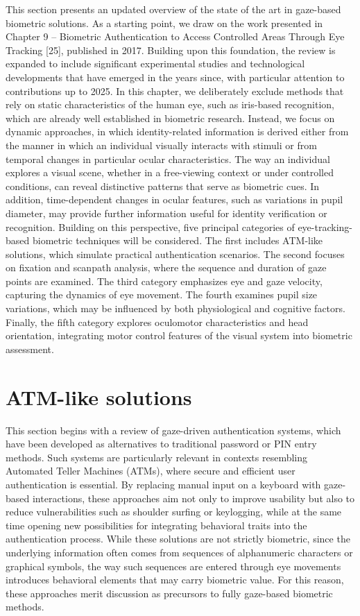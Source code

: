 \documentclass[12pt]{report}
\begin{document}
This section presents an updated overview of the state of the art in gaze-based biometric solutions.
As a starting point, we draw on the work presented in Chapter 9 – Biometric Authentication to Access Controlled Areas Through Eye Tracking [25], published in 2017. 
Building upon this foundation, the review is expanded to include significant experimental studies and technological developments that have emerged in the years since, with particular attention to contributions up to 2025.
In this chapter, we deliberately exclude methods that rely on static characteristics of the human eye, such as iris-based recognition, which are already well established in biometric research. 
Instead, we focus on dynamic approaches, in which identity-related information is derived either from the manner in which an individual visually interacts with stimuli or from temporal changes in particular ocular characteristics.
The way an individual explores a visual scene, whether in a free-viewing context or under controlled conditions, can reveal distinctive patterns that serve as biometric cues.
In addition, time-dependent changes in ocular features, such as variations in pupil diameter, may provide further information useful for identity verification or recognition.
Building on this perspective, five principal categories of eye-tracking-based biometric techniques will be considered. 
The first includes ATM-like solutions, which simulate practical authentication scenarios.
The second focuses on fixation and scanpath analysis, where the sequence and duration of gaze points are examined. 
The third category emphasizes eye and gaze velocity, capturing the dynamics of eye movement. 
The fourth examines pupil size variations, which may be influenced by both physiological and cognitive factors.
Finally, the fifth category explores oculomotor characteristics and head orientation, integrating motor control features of the visual system into biometric assessment.

\section{ATM-like solutions}

This section begins with a review of gaze-driven authentication systems, which have been developed as alternatives to traditional password or PIN entry methods.
Such systems are particularly relevant in contexts resembling Automated Teller Machines (ATMs), where secure and efficient user authentication is essential. 
By replacing manual input on a keyboard with gaze-based interactions, these approaches aim not only to improve usability but also to reduce vulnerabilities such as shoulder surfing or keylogging, while at the same time opening new possibilities for integrating behavioral traits into the authentication process.
While these solutions are not strictly biometric, since the underlying information often comes from sequences of alphanumeric characters or graphical symbols, the way such sequences are entered through eye movements introduces behavioral elements that may carry biometric value.
For this reason, these approaches merit discussion as precursors to fully gaze-based biometric methods.
\end{document}
